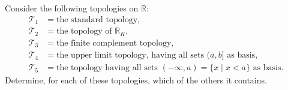   \begin{exercise}[Munkres 13.7]
    Consider the following topologies on $\mathbb{R}$:
    \begin{align*}
      \mathcal{T}_1 &= \text{the standard topology}, \\
      \mathcal{T}_2 &= \text{the topology of } \mathbb{R}_K, \\
      \mathcal{T}_3 &= \text{the finite complement topology}, \\
      \mathcal{T}_4 &= \text{the upper limit topology, having all sets } (a, b] \text{ as basis}, \\
      \mathcal{T}_5 &= \text{the topology having all sets } (-\infty, a) = \{x \mid x < a\} \text{ as basis}.
    \end{align*}
    Determine, for each of these topologies, which of the others it contains.
  \end{exercise}
